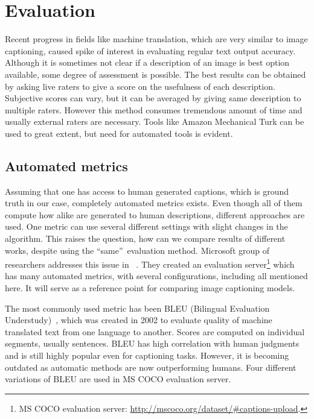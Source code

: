 \section{Evaluation}\label{sec:evaluation}

Recent progress in fields like machine translation, which are very similar to image captioning, caused spike of interest in evaluating regular text output accuracy. Although it is sometimes not clear if a description of an image is best option available, some degree of assessment is possible. The best results can be obtained by asking live raters to give a score on the usefulness of each description. Subjective scores can vary, but it can be averaged by giving same description to multiple raters. However this method consumes tremendous amount of time and usually external raters are necessary. Tools like Amazon Mechanical Turk can be used to great extent, but need for automated tools is evident.

\subsection{Automated metrics}

Assuming that one has access to human generated captions, which is ground truth in our case, completely automated metrics exists. Even though all of them compute how alike are generated to human descriptions, different approaches are used. One metric can use several different settings with slight changes in the algorithm. This raises the question, how can we compare results of different works, despite using the \textquotedblleft same\textquotedblright \ evaluation method. Microsoft group of researchers addresses this issue in ~\cite{DBLP:journals/corr/ChenFLVGDZ15}. They created an evaluation server\footnote{MS COCO evaluation server: \url{http://mscoco.org/dataset/\#captions-upload}.} which has many automated metrics, with several configurations, including all mentioned here. It will serve as a reference point for comparing image captioning models.

The most commonly used metric has been BLEU (Bilingual Evaluation Understudy)~\cite{Papineni:2002:BMA:1073083.1073135}, which was created in 2002 to evaluate quality of machine translated text from one language to another. Scores are computed on individual segments, usually sentences. BLEU has high correlation with human judgments and is still highly popular even for captioning tasks. However, it is becoming outdated as automatic methods are now outperforming humans. Four different variations of BLEU are used in MS COCO evaluation server.

